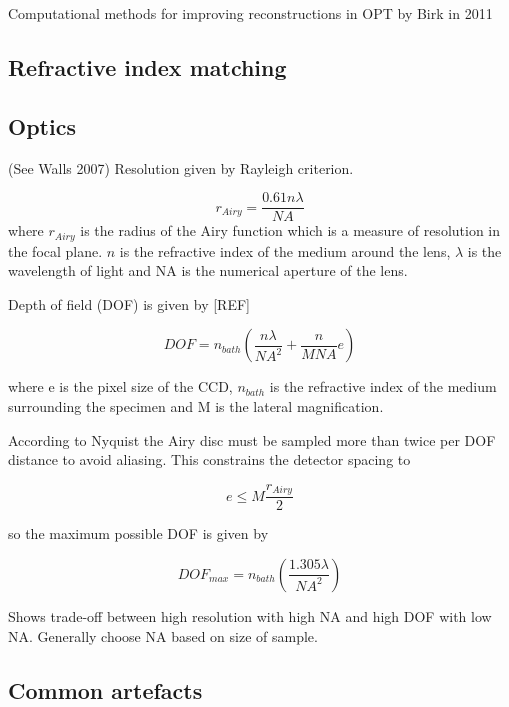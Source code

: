 \documentclass[12pt]{article}
\begin{document}
Computational methods for improving reconstructions in OPT by Birk in 2011 \cite{Birk:2011}

\subsection{Refractive index matching}


\subsection{Optics}

(See Walls 2007) Resolution given by Rayleigh criterion.

\begin{equation}
r_{Airy} = \dfrac{0.61n\lambda}{NA}
\end{equation}
where $r_{Airy}$ is the radius of the Airy function which is a measure of resolution in the focal plane. $n$ is the refractive index of the medium around the lens, $\lambda$ is the wavelength of light and NA is the numerical aperture of the lens. 

Depth of field (DOF) is given by [REF]
 
\begin{equation}
DOF = n_{bath}(\dfrac{n\lambda}{NA^{2}} + \dfrac{n}{M NA}e)
\end{equation}

where e is the pixel size of the CCD, $n_{bath}$ is the refractive index of the medium surrounding the specimen and M is the lateral magnification.

According to Nyquist the Airy disc must be sampled more than twice per DOF distance to avoid aliasing. This constrains the detector spacing to

\begin{equation}
e \leq M \dfrac{r_{Airy}}{2}
\end{equation}

so the maximum possible DOF is given by

\begin{equation}
DOF_{max} = n_{bath}(\dfrac{1.305\lambda}{NA^{2}})
\end{equation}

Shows trade-off between high resolution with high NA and high DOF with low NA. Generally choose NA based on size of sample.

\subsection{Common artefacts}
\end{document}
